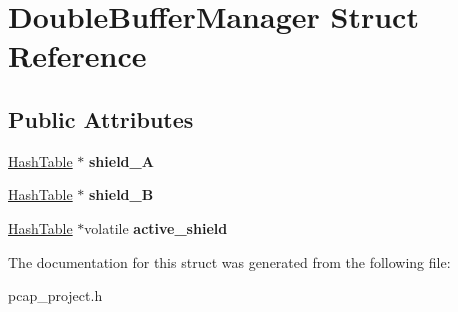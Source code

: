 \hypertarget{structDoubleBufferManager}{}\section{Double\+Buffer\+Manager Struct Reference}
\label{structDoubleBufferManager}
\subsection*{Public Attributes}
\begin{DoxyCompactItemize}
\item 
\mbox{\label{structDoubleBufferManager_af87ef5ae603aa1a2f8f31dc951b44a76}} 
\mbox{\hyperlink{structHashTable}{Hash\+Table}} $\ast$ {\bfseries shield\+\_\+A}
\item 
\mbox{\label{structDoubleBufferManager_acefee8ea575669c24f222247be9915a6}} 
\mbox{\hyperlink{structHashTable}{Hash\+Table}} $\ast$ {\bfseries shield\+\_\+B}
\item 
\mbox{\label{structDoubleBufferManager_a29d3f1d212f8d3cf7329ee95ade3b26d}} 
\mbox{\hyperlink{structHashTable}{Hash\+Table}} $\ast$volatile {\bfseries active\+\_\+shield}
\end{DoxyCompactItemize}


The documentation for this struct was generated from the following file\+:\begin{DoxyCompactItemize}
\item 
pcap\+\_\+project.\+h\end{DoxyCompactItemize}
